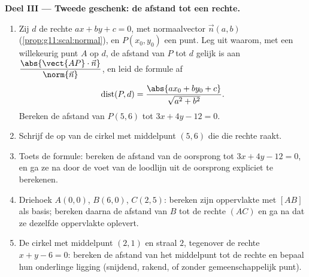 \begin{problem}
\medskip
\noindent\textbf{Deel III --- Tweede geschenk: de afstand tot een rechte.}
\begin{enumerate}[resume]
  \item Zij $d$ de rechte $ax + by + c = 0$, met normaalvector $\vec n(a, b)$
        (\cref{prop:g11:scal:normal}), en $P(x_0, y_0)$ een punt. Leg uit
        waarom, met een willekeurig punt $A$ op $d$, de afstand van $P$ tot
        $d$ gelijk is aan
        $\dfrac{\abs{\vect{AP} \cdot \vec n}}{\norm{\vec n}}$, en leid de
        formule af
        \[
        \operatorname{dist}(P, d)
        = \frac{\abs{a x_0 + b y_0 + c}}{\sqrt{a^2 + b^2}} .
        \]
        Bereken de afstand van $P(5, 6)$ tot $3x + 4y - 12 = 0$.
  \item Schrijf de  op van de cirkel met middelpunt $(5, 6)$ die
        die rechte raakt.
  \item Toets de formule: bereken de afstand van de oorsprong tot
        $3x + 4y - 12 = 0$, en ga ze na door de voet van de loodlijn uit de
        oorsprong expliciet te berekenen.
  \item Driehoek $A(0,0)$, $B(6,0)$, $C(2,5)$: bereken zijn oppervlakte met
        $[AB]$ als basis; bereken daarna de afstand van $B$ tot de rechte
        $(AC)$ en ga na dat ze dezelfde oppervlakte oplevert.
  \item De cirkel met middelpunt $(2, 1)$ en straal $2$, tegenover de rechte
        $x + y - 6 = 0$: bereken de afstand van het middelpunt tot de rechte
        en bepaal hun onderlinge ligging (snijdend, rakend, of zonder
        gemeenschappelijk punt).
\end{enumerate}


\end{problem}
